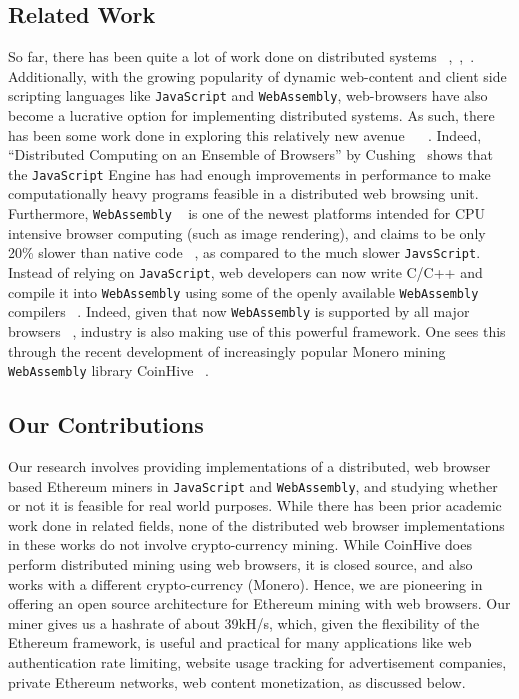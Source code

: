 \documentclass[runningheads]{llncs}
\begin{document}
\subsection{Related Work}
So far, there has been quite a lot of work done on distributed systems ~\cite{scheduling},~\cite{parallel},~\cite{orca}. Additionally, with the growing popularity of dynamic web-content and client side scripting languages like \verb|JavaScript| and \verb|WebAssembly|, web-browsers have also become a lucrative option for implementing distributed systems. As such, there has been some work done in exploring this relatively new avenue ~\cite{WebFlow} ~\cite{Duda}. 
Indeed, ``Distributed Computing on an Ensemble of Browsers'' by Cushing~\cite{Cushing} shows that the \verb|JavaScript| Engine has had enough improvements in performance to make computationally heavy programs feasible in a distributed web browsing unit. 
Furthermore, \verb|WebAssembly|  ~\cite{webAssembly} is one of the newest platforms intended for CPU intensive browser computing (such as image rendering), and claims to be only 20\% slower than native code ~\cite{wasmPerf}, as compared to the much slower \verb|JavsScript|. Instead of relying on \verb|JavaScript|, web developers can now write C/C++ and compile it into \verb|WebAssembly| using some of the openly available \verb|WebAssembly| compilers ~\cite{emscripten}. Indeed, given that now \verb|WebAssembly| is supported by all major browsers ~\cite{webAssembly}, industry is also making use of this powerful framework. One sees this through the recent development of increasingly popular Monero mining \verb|WebAssembly| library CoinHive ~\cite{coinhive}.

\subsection{Our Contributions}
Our research involves providing implementations of a distributed, web browser based Ethereum miners in \verb|JavaScript| and \verb|WebAssembly|, and studying whether or not it is feasible for real world purposes. While there has been prior academic work done in related fields, none of the distributed web browser implementations in these works do not involve crypto-currency mining. While CoinHive does perform distributed mining using web browsers, it is closed source, and also works with a different crypto-currency (Monero). Hence, we are pioneering in offering an open source architecture for Ethereum mining with web browsers. Our miner gives us a hashrate of about 39kH/s, which, given the flexibility of the Ethereum framework, is useful and practical for many applications like web authentication rate limiting, website usage tracking for advertisement companies, private Ethereum networks, web content monetization, as discussed below.
\end{document}
